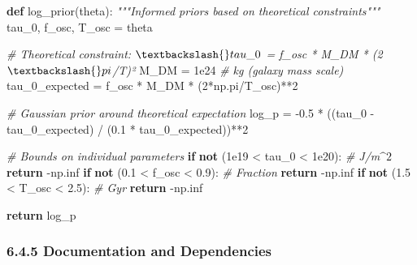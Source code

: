\documentclass[
  11pt,
]{report}
\newenvironment{Shaded}{}{}
\newcommand{\CommentTok}[1]{\textcolor[rgb]{0.38,0.63,0.69}{\textit{#1}}}
\newcommand{\ControlFlowTok}[1]{\textcolor[rgb]{0.00,0.44,0.13}{\textbf{#1}}}
\newcommand{\DecValTok}[1]{\textcolor[rgb]{0.25,0.63,0.44}{#1}}
\newcommand{\FloatTok}[1]{\textcolor[rgb]{0.25,0.63,0.44}{#1}}
\newcommand{\KeywordTok}[1]{\textcolor[rgb]{0.00,0.44,0.13}{\textbf{#1}}}
\newcommand{\NormalTok}[1]{#1}
\newcommand{\OperatorTok}[1]{\textcolor[rgb]{0.40,0.40,0.40}{#1}}
\begin{document}
\begin{Shaded}
\begin{Highlighting}[]
\KeywordTok{def}\NormalTok{ log\_prior(theta):}
    \CommentTok{"""Informed priors based on theoretical constraints"""}
\NormalTok{    tau\_0, f\_osc, T\_osc }\OperatorTok{=}\NormalTok{ theta}
    
    \CommentTok{\# Theoretical constraint: $\textbackslash{}tau\_0$ = f\_osc * M\_DM * (2$\textbackslash{}pi$/T)²}
\NormalTok{    M\_DM }\OperatorTok{=} \FloatTok{1e24}  \CommentTok{\# kg (galaxy mass scale)}
\NormalTok{    tau\_0\_expected }\OperatorTok{=}\NormalTok{ f\_osc }\OperatorTok{*}\NormalTok{ M\_DM }\OperatorTok{*}\NormalTok{ (}\DecValTok{2}\OperatorTok{*}\NormalTok{np.pi}\OperatorTok{/}\NormalTok{T\_osc)}\OperatorTok{**}\DecValTok{2}
    
    \CommentTok{\# Gaussian prior around theoretical expectation}
\NormalTok{    log\_p }\OperatorTok{=} \OperatorTok{{-}}\FloatTok{0.5} \OperatorTok{*}\NormalTok{ ((tau\_0 }\OperatorTok{{-}}\NormalTok{ tau\_0\_expected) }\OperatorTok{/}\NormalTok{ (}\FloatTok{0.1} \OperatorTok{*}\NormalTok{ tau\_0\_expected))}\OperatorTok{**}\DecValTok{2}
    
    \CommentTok{\# Bounds on individual parameters}
    \ControlFlowTok{if} \KeywordTok{not}\NormalTok{ (}\FloatTok{1e19} \OperatorTok{\textless{}}\NormalTok{ tau\_0 }\OperatorTok{\textless{}} \FloatTok{1e20}\NormalTok{):  }\CommentTok{\# J/m$\^{}2$}
        \ControlFlowTok{return} \OperatorTok{{-}}\NormalTok{np.inf}
    \ControlFlowTok{if} \KeywordTok{not}\NormalTok{ (}\FloatTok{0.1} \OperatorTok{\textless{}}\NormalTok{ f\_osc }\OperatorTok{\textless{}} \FloatTok{0.9}\NormalTok{):     }\CommentTok{\# Fraction}
        \ControlFlowTok{return} \OperatorTok{{-}}\NormalTok{np.inf}
    \ControlFlowTok{if} \KeywordTok{not}\NormalTok{ (}\FloatTok{1.5} \OperatorTok{\textless{}}\NormalTok{ T\_osc }\OperatorTok{\textless{}} \FloatTok{2.5}\NormalTok{):     }\CommentTok{\# Gyr}
        \ControlFlowTok{return} \OperatorTok{{-}}\NormalTok{np.inf}
    
    \ControlFlowTok{return}\NormalTok{ log\_p}
\end{Highlighting}
\end{Shaded}

\subsubsection{6.4.5 Documentation and
Dependencies}\label{documentation-and-dependencies}
\end{document}

